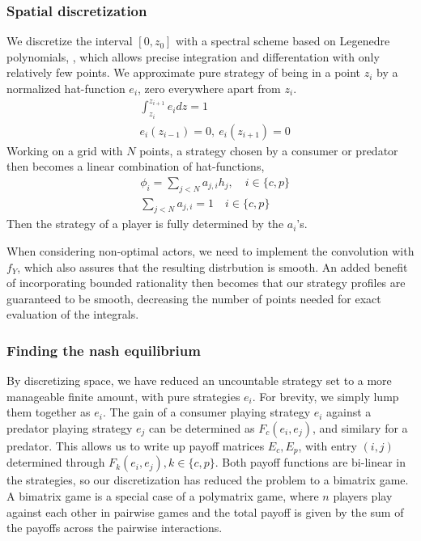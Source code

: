 \subsubsection*{Spatial discretization}
We discretize the interval $[0,z_0]$ with a spectral scheme based on Legenedre polynomials, \citep{kopriva2009implementing}, which allows precise integration and differentation with only relatively few points.
We approximate pure strategy of being in a point $z_i$  by a normalized hat-function $e_i$, zero everywhere apart from $z_i$.
\begin{align}
	& \int_{z_i}^{z_{i+1}} e_i dz = 1 \\
	&e_i(z_{i-1}) = 0,~ e_i(z_{i+1}) = 0
\end{align}
Working on a grid with $N$ points, a strategy chosen by a consumer or predator then becomes a linear combination of hat-functions,
\begin{align}
  &\phi_{i} = \sum_{j<N} a_{j,i} h_j, \quad i\in \{c,p\} \\
  &\sum_{j<N} a_{j,i} = 1 \quad i\in \{c,p\}
\end{align}
Then the strategy of a player is fully determined by the $a_i$'s.

When considering non-optimal actors, we need to implement the convolution with $f_Y$, which also assures that the resulting distrbution is smooth. An added benefit of incorporating bounded rationality then becomes that our strategy profiles are guaranteed to be smooth, decreasing the number of points needed for exact evaluation of the integrals.


\subsubsection*{Finding the nash equilibrium}
By discretizing space, we have reduced an uncountable strategy set to a more manageable finite amount, with pure strategies $e_i$. For brevity, we simply lump them together as $e_i$. The gain of a consumer playing strategy $e_i$ against a predator playing strategy $e_j$ can be determined as $F_c(e_i,e_j)$, and similary for a predator. This allows us to write up payoff matrices $E_c, E_p$, with entry $(i,j)$ determined through $F_k(e_i,e_j), k \in \{c, p\}$.  Both payoff functions are bi-linear in the strategies, so our discretization has reduced the problem to a bimatrix game. A bimatrix game is a special case of a polymatrix game, where $n$ players play against each other in pairwise games and the total payoff is given by the sum of the payoffs across the pairwise interactions. %



